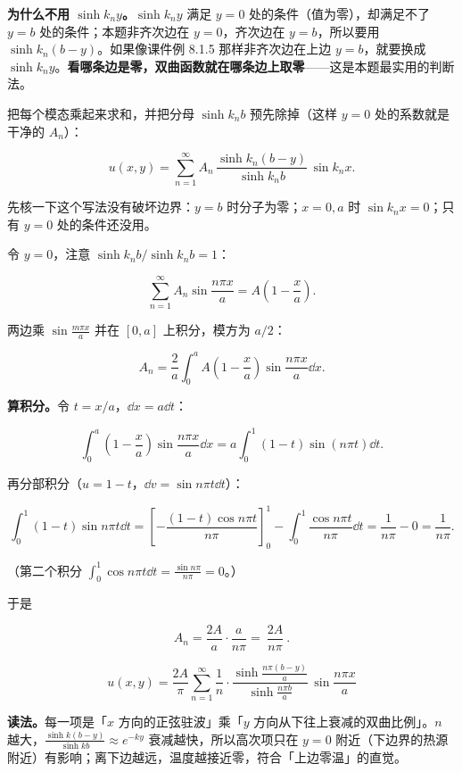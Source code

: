 \textbf{为什么不用 $\sinh k_ny$。}$\sinh k_ny$ 满足 $y=0$ 处的条件（值为零），却满足不了 $y=b$ 处的条件；本题非齐次边在 $y=0$，齐次边在 $y=b$，所以要用 $\sinh k_n(b-y)$。如果像课件例 8.1.5 那样非齐次边在上边 $y=b$，就要换成 $\sinh k_ny$。\textbf{看哪条边是零，双曲函数就在哪条边上取零}——这是本题最实用的判断法。


把每个模态乘起来求和，并把分母 $\sinh k_nb$ 预先除掉（这样 $y=0$ 处的系数就是干净的 $A_n$）：

\[
u(x,y)=\sum_{n=1}^{\infty}A_n\,\frac{\sinh k_n(b-y)}{\sinh k_nb}\,\sin k_nx .
\]

先核一下这个写法没有破坏边界：$y=b$ 时分子为零；$x=0,a$ 时 $\sin k_nx=0$；只有 $y=0$ 处的条件还没用。

令 $y=0$，注意 $\sinh k_nb/\sinh k_nb=1$：

\[
\sum_{n=1}^{\infty}A_n\sin\frac{n\pi x}{a}=A\left(1-\frac{x}{a}\right).
\]

两边乘 $\sin\frac{m\pi x}{a}$ 并在 $[0,a]$ 上积分，模方为 $a/2$：

\[
A_n=\frac{2}{a}\int_0^aA\left(1-\frac{x}{a}\right)\sin\frac{n\pi x}{a}\dd x .
\]

\textbf{算积分。}令 $t=x/a$，$\dd x=a\dd t$：

\[
\int_0^a\left(1-\frac{x}{a}\right)\sin\frac{n\pi x}{a}\dd x
=a\int_0^1(1-t)\sin(n\pi t)\dd t .
\]

再分部积分（$u=1-t$，$\dd v=\sin n\pi t\dd t$）：

\[
\int_0^1(1-t)\sin n\pi t\dd t
=\left[-\frac{(1-t)\cos n\pi t}{n\pi}\right]_0^1-\int_0^1\frac{\cos n\pi t}{n\pi}\dd t
=\frac{1}{n\pi}-0=\frac{1}{n\pi}.
\]

（第二个积分 $\int_0^1\cos n\pi t\dd t=\frac{\sin n\pi}{n\pi}=0$。）

于是

\[
A_n=\frac{2A}{a}\cdot\frac{a}{n\pi}
=\boxed{\ \frac{2A}{n\pi}\ }.
\]


\[
\boxed{\;
u(x,y)=\frac{2A}{\pi}\sum_{n=1}^{\infty}\frac{1}{n}\cdot
\frac{\sinh\frac{n\pi(b-y)}{a}}{\sinh\frac{n\pi b}{a}}\,
\sin\frac{n\pi x}{a}
\;}
\]

\textbf{读法。}每一项是「$x$ 方向的正弦驻波」乘「$y$ 方向从下往上衰减的双曲比例」。$n$ 越大，$\frac{\sinh k(b-y)}{\sinh kb}\approx e^{-ky}$ 衰减越快，所以高次项只在 $y=0$ 附近（下边界的热源附近）有影响；离下边越远，温度越接近零，符合「上边零温」的直觉。

